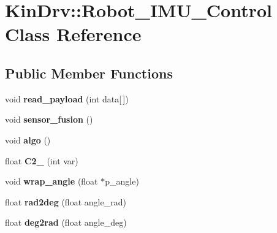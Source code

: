 \hypertarget{classKinDrv_1_1Robot__IMU__Control}{\section{Kin\+Drv\+:\+:Robot\+\_\+\+I\+M\+U\+\_\+\+Control Class Reference}
\label{classKinDrv_1_1Robot__IMU__Control}
}
\subsection*{Public Member Functions}
\begin{DoxyCompactItemize}
\item 
\hypertarget{classKinDrv_1_1Robot__IMU__Control_a0e7b0fc8d61e08eedc29e5214218445a}{void {\bfseries read\+\_\+payload} (int data\mbox{[}$\,$\mbox{]})}\label{classKinDrv_1_1Robot__IMU__Control_a0e7b0fc8d61e08eedc29e5214218445a}

\item 
\hypertarget{classKinDrv_1_1Robot__IMU__Control_a6bc398065c2a7ae41057f8999dd3acb2}{void {\bfseries sensor\+\_\+fusion} ()}\label{classKinDrv_1_1Robot__IMU__Control_a6bc398065c2a7ae41057f8999dd3acb2}

\item 
\hypertarget{classKinDrv_1_1Robot__IMU__Control_a02498133fb9c8edfbd99ee44c6a36095}{void {\bfseries algo} ()}\label{classKinDrv_1_1Robot__IMU__Control_a02498133fb9c8edfbd99ee44c6a36095}

\item 
\hypertarget{classKinDrv_1_1Robot__IMU__Control_aceb015eb2e137c6b378397742bc3a057}{float {\bfseries C2\+\_} (int var)}\label{classKinDrv_1_1Robot__IMU__Control_aceb015eb2e137c6b378397742bc3a057}

\item 
\hypertarget{classKinDrv_1_1Robot__IMU__Control_af6d18fb8a8a615e6fb6e1c9d1eea5389}{void {\bfseries wrap\+\_\+angle} (float $\ast$p\+\_\+angle)}\label{classKinDrv_1_1Robot__IMU__Control_af6d18fb8a8a615e6fb6e1c9d1eea5389}

\item 
\hypertarget{classKinDrv_1_1Robot__IMU__Control_a902e6312ccf4d73b8f11c6f77e00f411}{float {\bfseries rad2deg} (float angle\+\_\+rad)}\label{classKinDrv_1_1Robot__IMU__Control_a902e6312ccf4d73b8f11c6f77e00f411}

\item 
\hypertarget{classKinDrv_1_1Robot__IMU__Control_a11536918b5777f6829f044e227e0c469}{float {\bfseries deg2rad} (float angle\+\_\+deg)}\label{classKinDrv_1_1Robot__IMU__Control_a11536918b5777f6829f044e227e0c469}

\end{DoxyCompactItemize}
